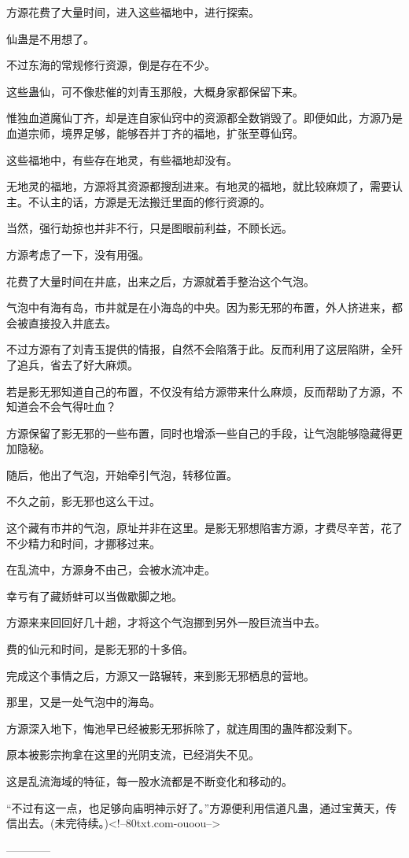 \begin{this_body}
方源花费了大量时间，进入这些福地中，进行探索。

仙蛊是不用想了。

不过东海的常规修行资源，倒是存在不少。

这些蛊仙，可不像悲催的刘青玉那般，大概身家都保留下来。

惟独血道魔仙丁齐，却是连自家仙窍中的资源都全数销毁了。即便如此，方源乃是血道宗师，境界足够，能够吞并丁齐的福地，扩张至尊仙窍。

这些福地中，有些存在地灵，有些福地却没有。

无地灵的福地，方源将其资源都搜刮进来。有地灵的福地，就比较麻烦了，需要认主。不认主的话，方源是无法搬迁里面的修行资源的。

当然，强行劫掠也并非不行，只是图眼前利益，不顾长远。

方源考虑了一下，没有用强。

花费了大量时间在井底，出来之后，方源就着手整治这个气泡。

气泡中有海有岛，市井就是在小海岛的中央。因为影无邪的布置，外人挤进来，都会被直接投入井底去。

不过方源有了刘青玉提供的情报，自然不会陷落于此。反而利用了这层陷阱，全歼了追兵，省去了好大麻烦。

若是影无邪知道自己的布置，不仅没有给方源带来什么麻烦，反而帮助了方源，不知道会不会气得吐血？

方源保留了影无邪的一些布置，同时也增添一些自己的手段，让气泡能够隐藏得更加隐秘。

随后，他出了气泡，开始牵引气泡，转移位置。

不久之前，影无邪也这么干过。

这个藏有市井的气泡，原址并非在这里。是影无邪想陷害方源，才费尽辛苦，花了不少精力和时间，才挪移过来。

在乱流中，方源身不由己，会被水流冲走。

幸亏有了藏娇蚌可以当做歇脚之地。

方源来来回回好几十趟，才将这个气泡挪到另外一股巨流当中去。

费的仙元和时间，是影无邪的十多倍。

完成这个事情之后，方源又一路辗转，来到影无邪栖息的营地。

那里，又是一处气泡中的海岛。

方源深入地下，悔池早已经被影无邪拆除了，就连周围的蛊阵都没剩下。

原本被影宗拘拿在这里的光阴支流，已经消失不见。

这是乱流海域的特征，每一股水流都是不断变化和移动的。

“不过有这一点，也足够向庙明神示好了。”方源便利用信道凡蛊，通过宝黄天，传信出去。(未完待续。)<!--80txt.com-ouoou-->

------------

\end{this_body}

